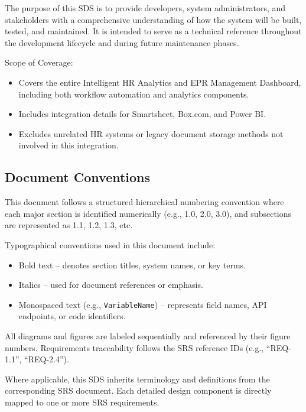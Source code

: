 \documentclass[12pt]{article}
\def\textbf#1{#1}%
\def\textit#1{#1}%
\def\&{ and }%
\begin{document}
The purpose of this SDS is to provide developers, system administrators, and stakeholders with a comprehensive understanding of how the system will be built, tested, and maintained. It is intended to serve as a technical reference throughout the development lifecycle and during future maintenance phases.

\textbf{Scope of Coverage:}
\begin{itemize}[nosep]
    \item Covers the entire Intelligent HR Analytics \& EPR Management Dashboard, including both workflow automation and analytics components.
    \item Includes integration details for Smartsheet, Box.com, and Power BI.
    \item Excludes unrelated HR systems or legacy document storage methods not involved in this integration.
\end{itemize}

\subsection{Document Conventions}
This document follows a structured hierarchical numbering convention where each major section is identified numerically (e.g., 1.0, 2.0, 3.0), and subsections are represented as 1.1, 1.2, 1.3, etc.

Typographical conventions used in this document include:
\begin{itemize}[nosep]
    \item \textbf{Bold text} – denotes section titles, system names, or key terms.
    \item \textit{Italics} – used for document references or emphasis.
    \item Monospaced text (e.g., \texttt{VariableName}) – represents field names, API endpoints, or code identifiers.
\end{itemize}

All diagrams and figures are labeled sequentially and referenced by their figure numbers. Requirements traceability follows the SRS reference IDs (e.g., “REQ-1.1”, “REQ-2.4”).

Where applicable, this SDS inherits terminology and definitions from the corresponding SRS document. Each detailed design component is directly mapped to one or more SRS requirements.
\end{document}

